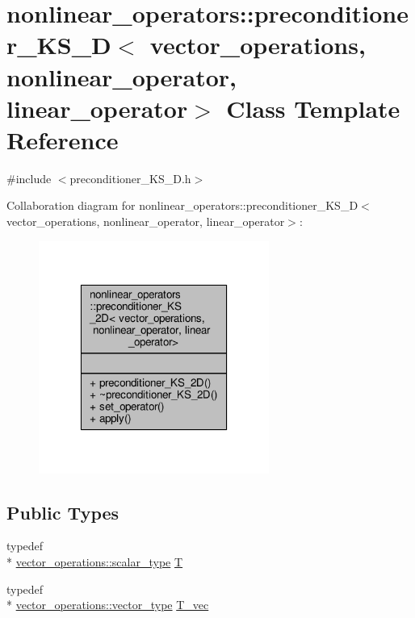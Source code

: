 \hypertarget{classnonlinear__operators_1_1preconditioner__KS__2D}{\section{nonlinear\-\_\-operators\-:\-:preconditioner\-\_\-\-K\-S\-\_\-D$<$ vector\-\_\-operations, nonlinear\-\_\-operator, linear\-\_\-operator$>$ Class Template Reference}
\label{classnonlinear__operators_1_1preconditioner__KS__2D}
}


{\ttfamily \#include $<$preconditioner\-\_\-\-K\-S\-\_\-D.\-h$>$}



Collaboration diagram for nonlinear\-\_\-operators\-:\-:preconditioner\-\_\-\-K\-S\-\_\-D$<$ vector\-\_\-operations, nonlinear\-\_\-operator, linear\-\_\-operator$>$\-:
\nopagebreak
\begin{figure}[H]
\begin{center}
\leavevmode
\includegraphics[width=214pt]{classnonlinear__operators_1_1preconditioner__KS__2D__coll__graph}
\end{center}
\end{figure}
\subsection*{Public Types}
\begin{DoxyCompactItemize}
\item 
typedef \\*
\hyperlink{structcpu__vector__operations_aca6b216aa1fb172df83d98350e94fd61}{vector\-\_\-operations\-::scalar\-\_\-type} \hyperlink{classnonlinear__operators_1_1preconditioner__KS__2D_abdcb08394518180c04171faec737cd43}{T}
\item 
typedef \\*
\hyperlink{structcpu__vector__operations_a1962836df596ce262704d208e9a6d8f9}{vector\-\_\-operations\-::vector\-\_\-type} \hyperlink{classnonlinear__operators_1_1preconditioner__KS__2D_ac8a7bc16e8f8296371167534fe482263}{T\-\_\-vec}
\end{DoxyCompactItemize}
